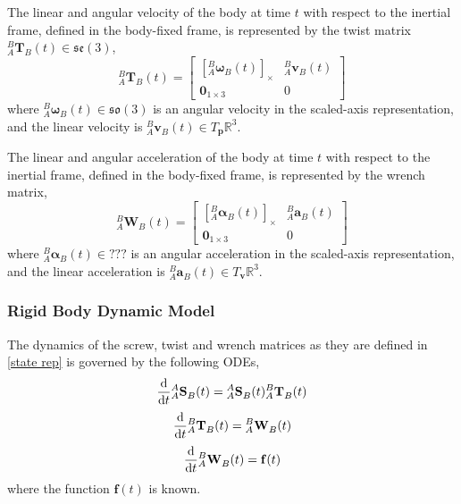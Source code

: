 		The linear and angular velocity of the body at time $t$ with respect to the inertial frame, defined in the body-fixed frame, is represented by the twist matrix ${^{B}_{A}\mathbf{T}^{}_{B}(t)} \in \mathfrak{se}(3)$,
		\begin{equation}
				{^{B}_{A}\mathbf{T}^{}_{B}(t)} = 
				\begin{bmatrix}
		  {[^{B}_{A}\mathbf{\omega}^{}_{B}(t)]_\times} 	& 	^{B}_{A}\mathbf{v}^{}_{B}(t)\\
		  \textbf{0}_{1 \times 3} & 0						  
				\end{bmatrix}
		\end{equation}
		where $^{B}_{A}\mathbf{\omega}^{}_{B}(t) \in \mathfrak{so}(3)$ is an angular velocity in the scaled-axis representation, and the linear velocity is $^{B}_{A}\mathbf{v}^{}_{B}(t) \in T_\mathbf{p}\mathbb{R}^3$.
				
		The linear and angular acceleration of the body at time $t$ with respect to the inertial frame, defined in the body-fixed frame, is represented by the wrench matrix,
		\begin{equation}
				{^{B}_{A}\mathbf{W}^{}_{B}(t)} = 
				\begin{bmatrix}
				  {[^{B}_{A}\mathbf{\alpha}^{}_{B}(t)]_\times} 	& 	^{B}_{A}\mathbf{a}^{}_{B}(t)\\
				  \textbf{0}_{1 \times 3} & 0						  
				\end{bmatrix}
		\end{equation}
		where $^{B}_{A}\mathbf{\alpha}^{}_{B}(t) \in ???$ is an angular acceleration in the scaled-axis representation, and the linear acceleration is $^{B}_{A}\mathbf{a}^{}_{B}(t) \in T_\mathbf{v}\mathbb{R}^3$.
						
	\subsubsection{Rigid Body Dynamic Model}
		The dynamics of the screw, twist and wrench matrices as they are defined in \ref{state rep} is governed by the following ODEs,
		\begin{equation}
			{\frac{\textnormal{d}}{\textnormal{d}t}} {^{A}_{A}\mathbf{S}^{}_{B}(t)} ={^{A}_{A}\mathbf{S}^{}_{B}(t)} {^{B}_{A}\mathbf{T}^{}_{B}(t)}
		\end{equation}		
		\begin{equation}
			{\frac{\textnormal{d}}{\textnormal{d}t}} {^{B}_{A}\mathbf{T}^{}_{B}(t)} = {^{B}_{A}\mathbf{W}^{}_{B}(t)}
		\end{equation}		
		\begin{equation}
			{\frac{\textnormal{d}}{\textnormal{d}t}} {^{B}_{A}\mathbf{W}^{}_{B}(t)}=\mathbf{f}(t)			
		\end{equation}
		where the function $\mathbf{f}(t)$ is known.
		
